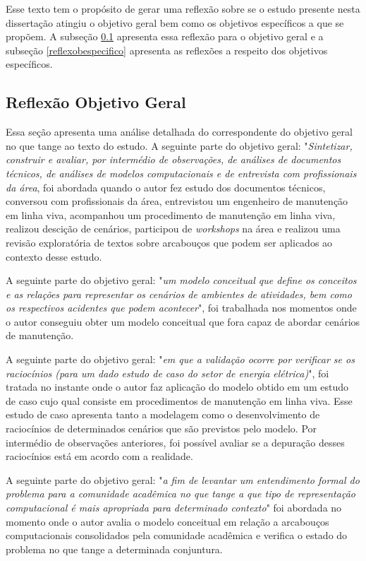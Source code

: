 Esse texto tem o propósito de gerar uma reflexão sobre se o estudo presente nesta dissertação atingiu o objetivo geral bem como os objetivos específicos a que se propõem. A subseção \ref{reflexobgeral} apresenta essa reflexão para o objetivo geral e a subseção \ref{reflexobespecifico} apresenta as reflexões a respeito dos objetivos específicos.

\subsection{Reflexão Objetivo Geral}\label{reflexobgeral}

Essa seção apresenta uma análise detalhada do correspondente do objetivo geral no que tange ao texto do estudo. A seguinte parte do objetivo geral: "\textit{Sintetizar, construir e avaliar, por intermédio de observações, de análises de documentos técnicos, de análises de modelos computacionais e de entrevista com profissionais da área}, foi abordada quando o autor fez estudo dos documentos técnicos, conversou com profissionais da área, entrevistou um engenheiro de manutenção em linha viva, acompanhou um procedimento de manutenção em linha viva, realizou descição de cenários, participou de \textit{workshops} na área e realizou uma revisão exploratória de textos sobre arcabouços que podem ser aplicados ao contexto desse estudo. 

A seguinte parte do objetivo geral: "\textit{um modelo conceitual que define os conceitos e as relações para representar os cenários de ambientes de atividades, bem como os respectivos acidentes que podem acontecer}", foi trabalhada nos momentos onde o autor conseguiu obter um modelo conceitual que fora capaz de abordar cenários de manutenção. 

A seguinte parte do objetivo geral: "\textit{em que a validação ocorre por verificar se os raciocínios (para um dado estudo de caso do setor de energia elétrica)}", foi tratada no instante onde o autor faz aplicação do modelo obtido em um estudo de caso cujo qual consiste em procedimentos de manutenção em linha viva. Esse estudo de caso apresenta tanto a modelagem como o desenvolvimento de raciocínios de determinados cenários que são previstos pelo modelo. Por intermédio de observações anteriores, foi possível avaliar se a depuração desses raciocínios está em acordo com a realidade.  

A seguinte parte do objetivo geral: "\textit{a fim de levantar um entendimento formal do problema para a comunidade acadêmica no que tange a que tipo de representação computacional é mais apropriada para determinado contexto}" foi abordada no momento onde o autor avalia o modelo conceitual em relação a arcabouços computacionais consolidados pela comunidade acadêmica e verifica o estado do problema no que tange a determinada conjuntura. 

